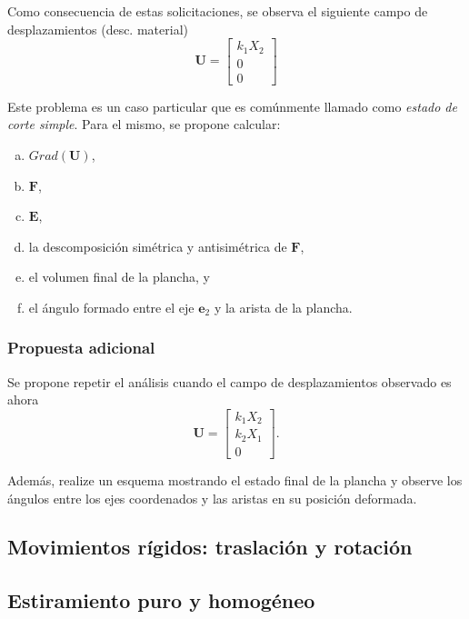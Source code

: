 \documentclass[12pt]{article}
\newcommand{\vc}[1]{\mathbf{#1}}
\begin{document}
Como consecuencia de estas solicitaciones, se observa el siguiente campo de desplazamientos (desc. material)
\begin{equation}
\vc U = \begin{bmatrix}
k_1 X_2 \\ 0 \\ 0
\end{bmatrix}
\end{equation}

Este problema es un caso particular que es comúnmente llamado como \textit{estado de corte simple}. Para el mismo, se propone calcular:
\begin{enumerate}[a)]
\item $Grad (\vc U)$,
\item $\vc F$,
\item $\vc E$,
\item la descomposición simétrica y antisimétrica de $\vc F$,
\item el volumen final de la plancha, y
\item el ángulo formado entre el eje $\vc e_2$ y la arista de la plancha.
\end{enumerate}

\subsubsection*{Propuesta adicional}
Se propone repetir el análisis cuando el campo de desplazamientos observado es ahora
\begin{equation}
\vc U = \begin{bmatrix}
k_1 X_2 \\ k_2 X_1 \\ 0
\end{bmatrix}.
\end{equation}

Además, realize un esquema mostrando el estado final de la plancha y observe los ángulos entre los ejes coordenados y las aristas en su posición deformada.



\subsection{Movimientos rígidos: traslación y rotación}



\subsection{Estiramiento puro y homogéneo}
\end{document}
